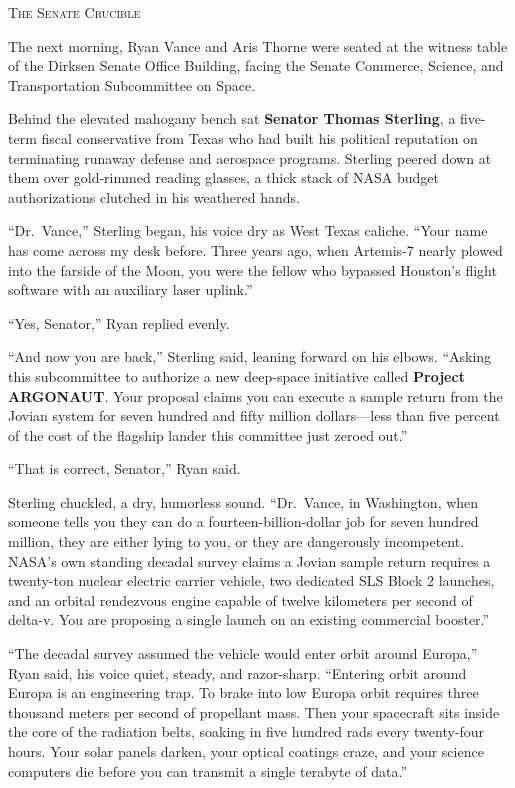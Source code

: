 \documentclass[12pt,twoside,openright]{book}
\newcommand{\sceneheader}[1]{%
  \par\vspace{1.8em}%
  {\noindent\centering\scshape\large #1\par}%
  \vspace{1.0em}%
  \noindent%
}
\newcommand{\dinkus}{%
  \par\vspace{1.2em}%
  {\noindent\centering{\large $\ast\quad\ast\quad\ast$}\par}%
  \vspace{1.2em}%
  \noindent%
}
\begin{document}
\dinkus

\sceneheader{The Senate Crucible}

The next morning, Ryan Vance and Aris Thorne were seated at the witness
table of the Dirksen Senate Office Building, facing the Senate Commerce,
Science, and Transportation Subcommittee on Space.

Behind the elevated mahogany bench sat \textbf{Senator Thomas Sterling},
a five-term fiscal conservative from Texas who had built his political
reputation on terminating runaway defense and aerospace programs.
Sterling peered down at them over gold-rimmed reading glasses, a thick
stack of NASA budget authorizations clutched in his weathered hands.

``Dr.~Vance,'' Sterling began, his voice dry as West Texas caliche.
``Your name has come across my desk before. Three years ago, when
Artemis-7 nearly plowed into the farside of the Moon, you were the
fellow who bypassed Houston's flight software with an auxiliary laser
uplink.''

``Yes, Senator,'' Ryan replied evenly.

``And now you are back,'' Sterling said, leaning forward on his elbows.
``Asking this subcommittee to authorize a new deep-space initiative
called \textbf{Project ARGONAUT}. Your proposal claims you can execute a
sample return from the Jovian system for seven hundred and fifty million
dollars---less than five percent of the cost of the flagship lander this
committee just zeroed out.''

``That is correct, Senator,'' Ryan said.

Sterling chuckled, a dry, humorless sound. ``Dr.~Vance, in Washington,
when someone tells you they can do a fourteen-billion-dollar job for
seven hundred million, they are either lying to you, or they are
dangerously incompetent. NASA's own standing decadal survey claims a
Jovian sample return requires a twenty-ton nuclear electric carrier
vehicle, two dedicated SLS Block 2 launches, and an orbital rendezvous
engine capable of twelve kilometers per second of delta-v. You are
proposing a single launch on an existing commercial booster.''

``The decadal survey assumed the vehicle would enter orbit around
Europa,'' Ryan said, his voice quiet, steady, and razor-sharp.
``Entering orbit around Europa is an engineering trap. To brake into low
Europa orbit requires three thousand meters per second of propellant
mass. Then your spacecraft sits inside the core of the radiation belts,
soaking in five hundred rads every twenty-four hours. Your solar panels
darken, your optical coatings craze, and your science computers die
before you can transmit a single terabyte of data.''
\end{document}
